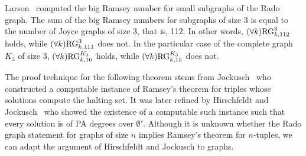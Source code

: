 Larson~\cite{MR2488745} computed the big Ramsey number for small subgraphs of the Rado graph.
The sum of the big Ramsey numbers for subgraphs of size 3 is equal to the number of Joyce graphs of size 3, that is, 112. In other words, $(\forall k)\mathrm{RG}^3_{k, 112}$ holds, while $(\forall k)\mathrm{RG}^3_{k, 111}$ does not. In the particular case of the complete graph $K_3$ of size 3,
$(\forall k)\mathrm{RG}^{K_3}_{k, 16}$ holds, while $(\forall k)\mathrm{RG}^{K_3}_{k, 15}$ does not.


The proof technique for the following theorem stems from Jockusch~\cite{Jockusch1972Ramseys} who constructed a computable instance of Ramsey's theorem for triples whose solutions compute the halting set. It was later refined by Hirschfeldt and Jockusch~\cite[Theorem 2.1]{Hirschfeldt2016notions} who showed the existence of a computable such instance such that every solution is of PA degrees over $\emptyset'$. Although it is unknown whether the Rado graph statement for graphs of size $n$ implies Ramsey's theorem for $n$-tuples, we can adapt the argument of Hirschfeldt and Jockusch to graphs.

